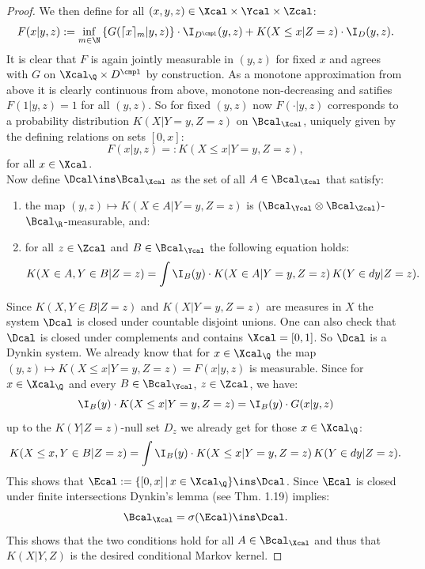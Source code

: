 \begin{Thm}
\begin{proof}
We then define for all $(x,y,z) \in \Xcal \times \Ycal \times \Zcal$: 
\[ F(x|y,z) := \inf_{m \in \N} \left \{ G(\lceil x\rceil_m|y,z)\right\} \cdot \I_{D^\cmpl}(y,z) +  K(X \le x|Z=z) \cdot \I_D(y,z). \]
It is clear that $F$ is again jointly measurable in $(y,z)$ for fixed $x$ and agrees with $G$  on $\Xcal_\Q \times D^\cmpl$ by construction.
As a monotone approximation from above it is clearly continuous from above, monotone non-decreasing and satifies $F(1|y,z)=1$ for all $(y,z)$.
So for fixed $(y,z)$ now $F(\cdot|y,z)$ corresponds to a probability distribution $ K(X|Y=y,Z=z)$ on $\Bcal_\Xcal$, uniquely given by the defining relations on sets $[0,x]$:
\[ F(x|y,z) =:  K(X \le x|Y=y,Z=z),\]
for all $x \in \Xcal$. \\
Now define $\Dcal \ins \Bcal_\Xcal$ as the set of all $A \in \Bcal_\Xcal$ that satisfy:
\begin{enumerate}
    \item the map $(y,z) \mapsto  K(X \in A|Y=y,Z=z)$ is $(\Bcal_\Ycal\otimes\Bcal_\Zcal)$-$\Bcal_\R$-measurable, and:
    \item for all $z \in \Zcal$ and $B \in \Bcal_\Ycal$ the following equation holds:
        \[  K(X \in A, Y \in B |Z=z) = \int \I_B(y) \cdot  K(X \in A | Y=y,Z=z) \,  K(Y \in dy | Z=z). \]
\end{enumerate}
Since $ K(X,Y \in B|Z=z)$ and $ K(X|Y=y,Z=z)$ are measures in $X$ the system $\Dcal$ is closed under countable disjoint unions. One can also check that $\Dcal$ is closed under
complements and contains $\Xcal=[0,1]$. So $\Dcal$ is a Dynkin system.
We already know that for $x \in \Xcal_\Q$ the map $(y,z) \mapsto  K(X \le x|Y=y,Z=z)=F(x|y,z)$ is measurable.
Since for $x \in \Xcal_\Q$ and every $B \in \Bcal_\Ycal$, $z \in \Zcal$, we have:
\[ \I_B(y) \cdot  K(X \le x | Y=y,Z=z) = \I_B(y) \cdot G(x|y,z) \]
up to the $ K(Y|Z=z)$-null set $D_z$ we already get for those $x \in \Xcal_\Q$:
\[  K(X \le x, Y \in B |Z=z) = \int \I_B(y) \cdot  K(X \le x | Y=y,Z=z) \,  K(Y \in dy | Z=z). \]
This shows that $\Ecal:=\{ [0,x] \,|\, x \in \Xcal_\Q\} \ins \Dcal$. Since $\Ecal$ is closed under finite intersections 
Dynkin's lemma (see \cite{Kle20} Thm. 1.19) implies: 
\[\Bcal_\Xcal=\sigma(\Ecal) \ins \Dcal.\]
This shows that the two conditions hold for all $A \in \Bcal_\Xcal$ and thus that $ K(X|Y,Z)$ is the desired conditional Markov kernel.
\end{proof}
\end{Thm}


